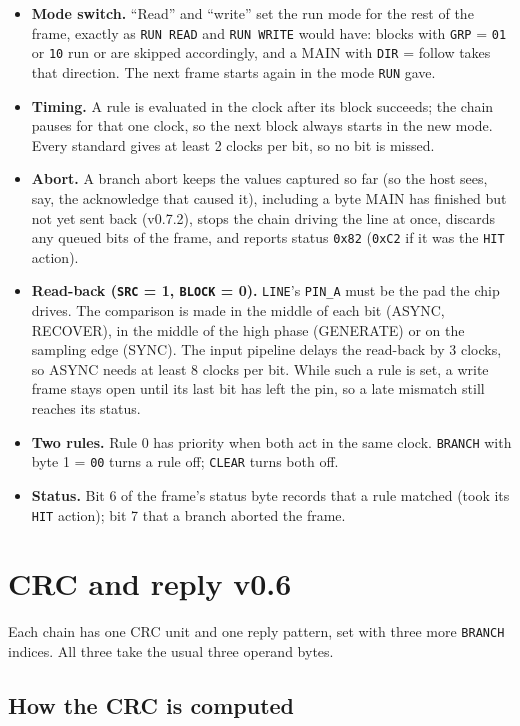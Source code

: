 \documentclass[11pt,a4paper]{article}
\newcommand{\vsix}{\textcolor{sixc}{\textsf{\small v0.6}}}
\newcommand{\vseventwo}{\textcolor{sevenc}{\textsf{\small v0.7.2}}}
\newcommand{\sig}[1]{\texttt{#1}}
\begin{document}
\begin{itemize}
\item \textbf{Mode switch.} ``Read'' and ``write'' set the run mode for the rest of the frame, exactly as \sig{RUN READ} and \sig{RUN WRITE} would have: blocks with \sig{GRP} = \texttt{01} or \texttt{10} run or are skipped accordingly, and a MAIN with \sig{DIR} = follow takes that direction. The next frame starts again in the mode \sig{RUN} gave.
\item \textbf{Timing.} A rule is evaluated in the clock after its block succeeds; the chain pauses for that one clock, so the next block always starts in the new mode. Every standard gives at least 2 clocks per bit, so no bit is missed.
\item \textbf{Abort.} A branch abort keeps the values captured so far (so the host sees, say, the acknowledge that caused it), including a byte MAIN has finished but not yet sent back (\vseventwo), stops the chain driving the line at once, discards any queued bits of the frame, and reports status \texttt{0x82} (\texttt{0xC2} if it was the \sig{HIT} action).
\item \textbf{Read-back (\sig{SRC} = 1, \sig{BLOCK} = 0).} \sig{LINE}'s \sig{PIN\_A} must be the pad the chip drives. The comparison is made in the middle of each bit (ASYNC, RECOVER), in the middle of the high phase (GENERATE) or on the sampling edge (SYNC). The input pipeline delays the read-back by 3 clocks, so ASYNC needs at least 8 clocks per bit. While such a rule is set, a write frame stays open until its last bit has left the pin, so a late mismatch still reaches its status.
\item \textbf{Two rules.} Rule 0 has priority when both act in the same clock. \sig{BRANCH} with byte 1 = \texttt{00} turns a rule off; \sig{CLEAR} turns both off.
\item \textbf{Status.} Bit 6 of the frame's status byte records that a rule matched (took its \sig{HIT} action); bit 7 that a branch aborted the frame.
\end{itemize}

\section{CRC and reply \vsix}\label{sec:crc}

Each chain has one CRC unit and one reply pattern, set with three more \sig{BRANCH} indices. All three take the usual three operand bytes.

\subsection{How the CRC is computed}
\end{document}
